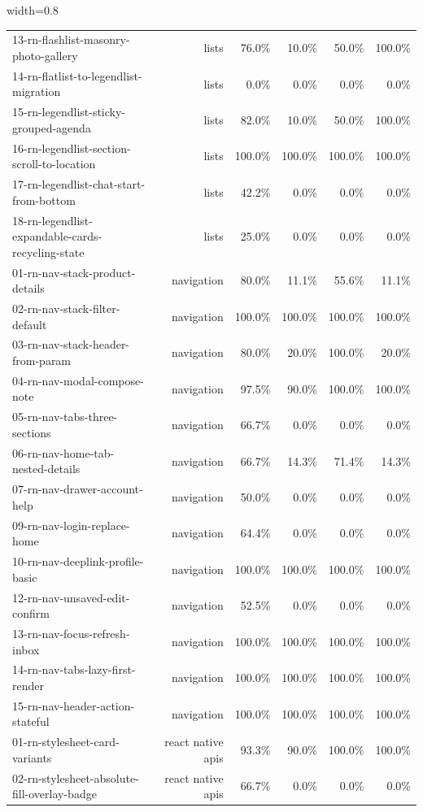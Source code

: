 \begin{table}[htbp]
\begin{adjustbox}{width=0.8\textwidth}
\begin{tabular}{lrrrrr}
13-rn-flashlist-masonry-photo-gallery & lists & 76.0\% & 10.0\% & 50.0\% & 100.0\% \\
14-rn-flatlist-to-legendlist-migration & lists & 0.0\% & 0.0\% & 0.0\% & 0.0\% \\
15-rn-legendlist-sticky-grouped-agenda & lists & 82.0\% & 10.0\% & 50.0\% & 100.0\% \\
16-rn-legendlist-section-scroll-to-location & lists & 100.0\% & 100.0\% & 100.0\% & 100.0\% \\
17-rn-legendlist-chat-start-from-bottom & lists & 42.2\% & 0.0\% & 0.0\% & 0.0\% \\
18-rn-legendlist-expandable-cards-recycling-state & lists & 25.0\% & 0.0\% & 0.0\% & 0.0\% \\
01-rn-nav-stack-product-details & navigation & 80.0\% & 11.1\% & 55.6\% & 11.1\% \\
02-rn-nav-stack-filter-default & navigation & 100.0\% & 100.0\% & 100.0\% & 100.0\% \\
03-rn-nav-stack-header-from-param & navigation & 80.0\% & 20.0\% & 100.0\% & 20.0\% \\
04-rn-nav-modal-compose-note & navigation & 97.5\% & 90.0\% & 100.0\% & 100.0\% \\
05-rn-nav-tabs-three-sections & navigation & 66.7\% & 0.0\% & 0.0\% & 0.0\% \\
06-rn-nav-home-tab-nested-details & navigation & 66.7\% & 14.3\% & 71.4\% & 14.3\% \\
07-rn-nav-drawer-account-help & navigation & 50.0\% & 0.0\% & 0.0\% & 0.0\% \\
09-rn-nav-login-replace-home & navigation & 64.4\% & 0.0\% & 0.0\% & 0.0\% \\
10-rn-nav-deeplink-profile-basic & navigation & 100.0\% & 100.0\% & 100.0\% & 100.0\% \\
12-rn-nav-unsaved-edit-confirm & navigation & 52.5\% & 0.0\% & 0.0\% & 0.0\% \\
13-rn-nav-focus-refresh-inbox & navigation & 100.0\% & 100.0\% & 100.0\% & 100.0\% \\
14-rn-nav-tabs-lazy-first-render & navigation & 100.0\% & 100.0\% & 100.0\% & 100.0\% \\
15-rn-nav-header-action-stateful & navigation & 100.0\% & 100.0\% & 100.0\% & 100.0\% \\
01-rn-stylesheet-card-variants & react native apis & 93.3\% & 90.0\% & 100.0\% & 100.0\% \\
02-rn-stylesheet-absolute-fill-overlay-badge & react native apis & 66.7\% & 0.0\% & 0.0\% & 0.0\% \\

\end{tabular}
\end{adjustbox}
\end{table}
